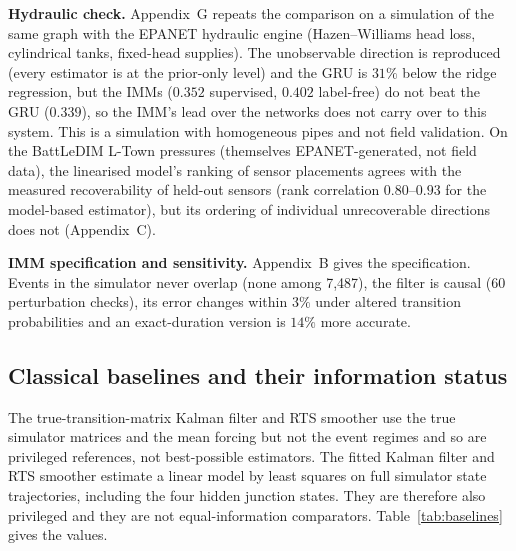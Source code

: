 \documentclass[conference]{IEEEtran}
\begin{document}
\textbf{Hydraulic check.} Appendix~G repeats the comparison on a simulation of the same graph with the EPANET hydraulic engine (Hazen--Williams head loss, cylindrical tanks, fixed-head supplies). The unobservable direction is reproduced (every estimator is at the prior-only level) and the GRU is $31\%$ below the ridge regression, but the IMMs ($0.352$ supervised, $0.402$ label-free) do not beat the GRU ($0.339$), so the IMM's lead over the networks does not carry over to this system. This is a simulation with homogeneous pipes and not field validation. On the BattLeDIM L-Town pressures (themselves EPANET-generated, not field data), the linearised model's ranking of sensor placements agrees with the measured recoverability of held-out sensors (rank correlation $0.80$--$0.93$ for the model-based estimator), but its ordering of individual unrecoverable directions does not (Appendix~C).

\textbf{IMM specification and sensitivity.} Appendix~B gives the specification. Events in the simulator never overlap (none among 7,487), the filter is causal (60 perturbation checks), its error changes within $3\%$ under altered transition probabilities and an exact-duration version is $14\%$ more accurate.

\subsection{Classical baselines and their information status}
\label{sec:baselines}

The true-transition-matrix Kalman filter and RTS smoother use the true simulator matrices and the mean forcing but not the event regimes and so are privileged references, not best-possible estimators. The fitted Kalman filter and RTS smoother estimate a linear model by least squares on full simulator state trajectories, including the four hidden junction states. They are therefore also privileged and they are not equal-information comparators. Table~\ref{tab:baselines} gives the values.

\begin{table}[t]
\centering
\caption{Classical baselines (seed 777).}
\label{tab:baselines}
\small
{}
\end{table}
\end{document}
